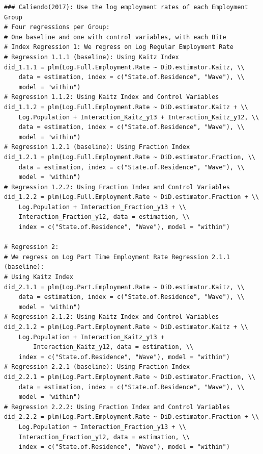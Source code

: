 \documentclass[a4paper]{article}
\begin{document}
{\begin{lstlisting}
### Caliendo(2017): Use the log employment rates of each Employment Group 
# Four regressions per Group: 
# One baseline and one with control variables, with each Bite 
# Index Regression 1: We regress on Log Regular Employment Rate 
# Regression 1.1.1 (baseline): Using Kaitz Index
did_1.1.1 = plm(Log.Full.Employment.Rate ~ DiD.estimator.Kaitz, \\ 
	data = estimation, index = c("State.of.Residence", "Wave"), \\ 
	model = "within")
# Regression 1.1.2: Using Kaitz Index and Control Variables
did_1.1.2 = plm(Log.Full.Employment.Rate ~ DiD.estimator.Kaitz + \\ 
	Log.Population + Interaction_Kaitz_y13 + Interaction_Kaitz_y12, \\ 
	data = estimation, index = c("State.of.Residence", "Wave"), \\ 
	model = "within")
# Regression 1.2.1 (baseline): Using Fraction Index
did_1.2.1 = plm(Log.Full.Employment.Rate ~ DiD.estimator.Fraction, \\ 
	data = estimation, index = c("State.of.Residence", "Wave"), \\ 
	model = "within")
# Regression 1.2.2: Using Fraction Index and Control Variables
did_1.2.2 = plm(Log.Full.Employment.Rate ~ DiD.estimator.Fraction + \\ 
	Log.Population + Interaction_Fraction_y13 + \\ 
	Interaction_Fraction_y12, data = estimation, \\ 
	index = c("State.of.Residence", "Wave"), model = "within")

# Regression 2: 
# We regress on Log Part Time Employment Rate Regression 2.1.1 (baseline): 
# Using Kaitz Index
did_2.1.1 = plm(Log.Part.Employment.Rate ~ DiD.estimator.Kaitz, \\ 
	data = estimation, index = c("State.of.Residence", "Wave"), \\ 
	model = "within")
# Regression 2.1.2: Using Kaitz Index and Control Variables
did_2.1.2 = plm(Log.Part.Employment.Rate ~ DiD.estimator.Kaitz + \\ 
	Log.Population + Interaction_Kaitz_y13 + 
    	Interaction_Kaitz_y12, data = estimation, \\ 
	index = c("State.of.Residence", "Wave"), model = "within")
# Regression 2.2.1 (baseline): Using Fraction Index
did_2.2.1 = plm(Log.Part.Employment.Rate ~ DiD.estimator.Fraction, \\ 
	data = estimation, index = c("State.of.Residence", "Wave"), \\ 
	model = "within")
# Regression 2.2.2: Using Fraction Index and Control Variables
did_2.2.2 = plm(Log.Part.Employment.Rate ~ DiD.estimator.Fraction + \\ 
	Log.Population + Interaction_Fraction_y13 + \\ 
	Interaction_Fraction_y12, data = estimation, \\ 
	index = c("State.of.Residence", "Wave"), model = "within")


\end{lstlisting}}
\end{document}
